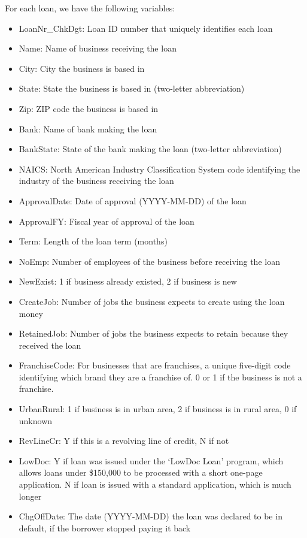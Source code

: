 \documentclass[11pt]{article}
\begin{document}
\noindent For each loan, we have the following variables:

\begin{itemize}
\item LoanNr\_ChkDgt:	Loan ID number that uniquely identifies each loan
\item Name: 	Name of business receiving the loan
\item City: 	City the business is based in
\item State: 	State the business is based in (two-letter abbreviation)
\item Zip: 	ZIP code the business is based in
\item Bank: 	Name of bank making the loan
\item BankState: 	State of the bank making the loan (two-letter abbreviation)
\item NAICS: 	North American Industry Classification System code identifying the industry of the business receiving the loan
\item ApprovalDate: 	Date of approval (YYYY-MM-DD) of the loan
\item ApprovalFY: 	Fiscal year of approval of the loan
\item Term: 	Length of the loan term (months)
\item NoEmp: 	Number of employees of the business before receiving the loan
\item NewExist: 	1 if business already existed, 2 if business is new
\item CreateJob: 	Number of jobs the business expects to create using the loan money
\item RetainedJob: 	Number of jobs the business expects to retain because they received the loan
\item FranchiseCode: 	For businesses that are franchises, a unique five-digit code identifying which brand they are a franchise of. 0 or 1 if the business is not a franchise.
\item UrbanRural: 	1 if business is in urban area, 2 if business is in rural area, 0 if unknown
\item RevLineCr: 	Y if this is a revolving line of credit, N if not
\item LowDoc: 	Y if loan was issued under the `LowDoc Loan' program, which allows loans under \$150,000 to be processed with a short one-page application. N if loan is issued with a standard application, which is much longer
\item ChgOffDate: 	The date (YYYY-MM-DD) the loan was declared to be in default, if the borrower stopped paying it back

\end{itemize}
\end{document}
